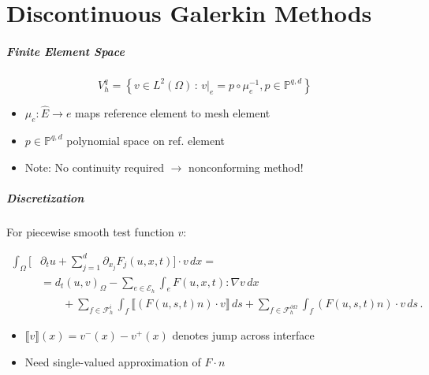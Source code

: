 \documentclass[aspectratio=169,11pt]{beamer}
\theoremstyle{definition}
\begin{document}

\part{Discontinuous Galerkin Methods}
\begin{frame}
\partpage
\end{frame}

\begin{frame}
\frametitle{Finite Element Space}

\begin{equation*}
V_h^q = \left\{ v\in L^2(\Omega) \,:\,
v|_e = p\circ\mu_e^{-1}, p\in\mathbb{P}^{q,d}\right\}
\end{equation*}

\begin{itemize}
  \item $\mu_e : \hat{E} \to e$ maps reference element to mesh element
  \item $p\in\mathbb{P}^{q,d}$ polynomial space on ref. element
  \item Note: No continuity required $\rightarrow$ nonconforming method!
\end{itemize}
\end{frame}

\begin{frame}
\frametitle{Discretization}
For piecewise smooth test function $v$:

\begin{equation*}\label{eq:DG_identity}
\begin{split}
\int_\Omega \biggl[&\partial_t u + \sum_{j=1}^{d}\partial_{x_j}F_j(u,x,t)\biggr]\cdot v \,dx = \\
&= d_t (u,v)_\Omega - \sum_{e\in\mathcal{E}_h} \int_e F(u,x,t) : \nabla v\,dx\\
&\qquad + \sum_{f\in\mathcal{F}_h^i} \int_f \llbracket (F(u,s,t)n)\cdot v \rrbracket \,ds
+ \sum_{f\in\mathcal{F}_h^{\partial\Omega}} \int_f (F(u,s,t)n)\cdot v \,ds \,.
\end{split}
\end{equation*}

\begin{itemize}
  \item $\llbracket v \rrbracket (x) = v^-(x)-v^+(x)$ denotes jump across interface
  \item Need single-valued approximation of $F \cdot n$
\end{itemize}
\end{frame}
\end{document}
